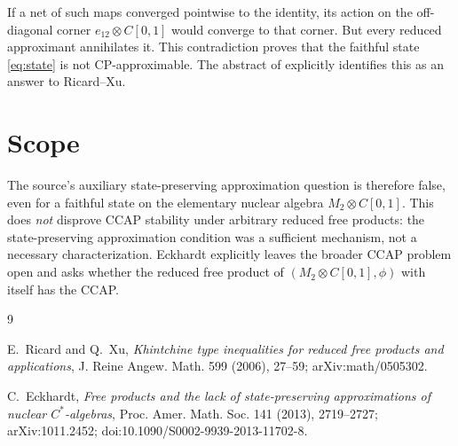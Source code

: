 \documentclass[11pt]{article}
\begin{document}
If a net of such maps converged pointwise to the identity, its action on the
off-diagonal corner $e_{12}\otimes C[0,1]$ would converge to that corner.
But every reduced approximant annihilates it.  This contradiction proves that
the faithful state \eqref{eq:state} is not CP-approximable.  The abstract of
\cite{Eckhardt} explicitly identifies this as an answer to Ricard--Xu.

\section*{Scope}

The source's auxiliary state-preserving approximation question is therefore
false, even for a faithful state on the elementary nuclear algebra
$M_2\otimes C[0,1]$.  This does \emph{not} disprove CCAP stability under
arbitrary reduced free products: the state-preserving approximation condition
was a sufficient mechanism, not a necessary characterization.  Eckhardt
explicitly leaves the broader CCAP problem open and asks whether the reduced
free product of $(M_2\otimes C[0,1],\phi)$ with itself has the CCAP.

\begin{thebibliography}{9}
\raggedright

E.~Ricard and Q.~Xu,
\emph{Khintchine type inequalities for reduced free products and
applications}, J. Reine Angew. Math. 599 (2006), 27--59;
arXiv:math/0505302.

C.~Eckhardt,
\emph{Free products and the lack of state-preserving approximations of
nuclear $C^*$-algebras}, Proc. Amer. Math. Soc. 141 (2013), 2719--2727;
arXiv:1011.2452; doi:10.1090/S0002-9939-2013-11702-8.

\end{thebibliography}
\end{document}
